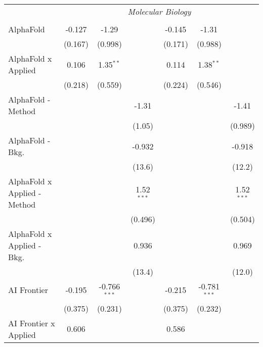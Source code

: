 \begin{tabular}{lcccccc}
 & \multicolumn{6}{c}{\textit{Molecular Biology}} \\ \\
   AlphaFold                    & -0.127        & -1.29          &                & -0.145        & -1.31          &   \\   
                                & (0.167)       & (0.998)        &                & (0.171)       & (0.988)        &   \\   
   AlphaFold x Applied          & 0.106         & 1.35$^{**}$    &                & 0.114         & 1.38$^{**}$    &   \\   
                                & (0.218)       & (0.559)        &                & (0.224)       & (0.546)        &   \\   
   AlphaFold - Method           &               &                & -1.31          &               &                & -1.41\\   
                                &               &                & (1.05)         &               &                & (0.989)\\   
   AlphaFold - Bkg.             &               &                & -0.932         &               &                & -0.918\\   
                                &               &                & (13.6)         &               &                & (12.2)\\   
   AlphaFold x Applied - Method &               &                & 1.52$^{***}$   &               &                & 1.52$^{***}$\\   
                                &               &                & (0.496)        &               &                & (0.504)\\   
   AlphaFold x Applied - Bkg.   &               &                & 0.936          &               &                & 0.969\\   
                                &               &                & (13.4)         &               &                & (12.0)\\   
   AI Frontier                  & -0.195        & -0.766$^{***}$ &                & -0.215        & -0.781$^{***}$ &   \\   
                                & (0.375)       & (0.231)        &                & (0.375)       & (0.232)        &   \\   
   AI Frontier x Applied        & 0.606         &                &                & 0.586         &                &   \\   

\end{tabular}
